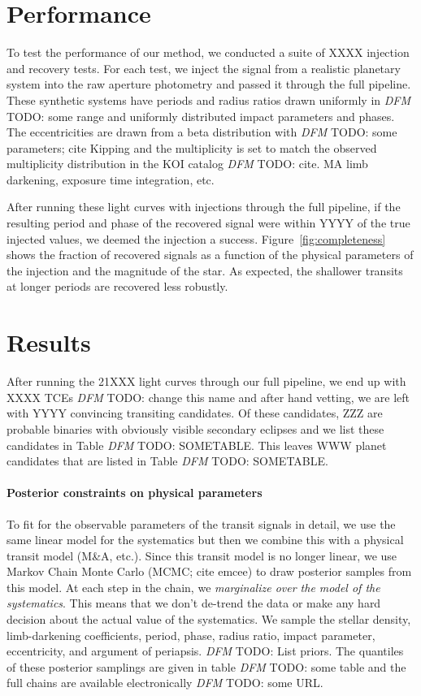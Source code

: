 \documentclass[12pt,preprint]{aastex}
\newcommand{\figref}[1]{\ref{fig:#1}}
\newcommand{\Fig}[1]{Figure~\figref{#1}}
\newcommand{\todo}[3]{{\color{#2} \emph{#1} TODO: #3}}
\newcommand{\dfmtodo}[1]{\todo{DFM}{red}{#1}}
\begin{document}
\section{Performance}

To test the performance of our method, we conducted a suite of XXXX injection
and recovery tests.
For each test, we inject the signal from a realistic planetary system into the
raw aperture photometry and passed it through the full pipeline.
These synthetic systems have periods and radius ratios drawn uniformly in
\dfmtodo{some range} and uniformly distributed impact parameters and phases.
The eccentricities are drawn from a beta distribution with \dfmtodo{some
parameters; cite Kipping} and the multiplicity is set to match the observed
multiplicity distribution in the KOI catalog \dfmtodo{cite}.
MA limb darkening, exposure time integration, etc.

After running these light curves with injections through the full pipeline, if
the resulting period and phase of the recovered signal were within YYYY of the
true injected values, we deemed the injection a success.
\Fig{completeness} shows the fraction of recovered signals as a function of the
physical parameters of the injection and the magnitude of the star.
As expected, the shallower transits at longer periods are recovered less
robustly.



\section{Results}

After running the 21XXX light curves through our full pipeline, we end up
with XXXX TCEs \dfmtodo{change this name} and after hand vetting, we are left
with YYYY convincing transiting candidates.
Of these candidates, ZZZ are probable binaries with obviously visible
secondary eclipses and we list these candidates in Table \dfmtodo{SOMETABLE}.
This leaves WWW planet candidates that are listed in Table
\dfmtodo{SOMETABLE}.

\paragraph{Posterior constraints on physical parameters}

To fit for the observable parameters of the transit signals in detail, we use
the same linear model for the systematics but then we combine this with a
physical transit model (M\&A, etc.).
Since this transit model is no longer linear, we use Markov Chain Monte Carlo
(MCMC; cite emcee) to draw posterior samples from this model.
At each step in the chain, we \emph{marginalize over the model of the
systematics}.
This means that we don't de-trend the data or make any hard decision about
the actual value of the systematics.
We sample the stellar density, limb-darkening coefficients, period, phase,
radius ratio, impact parameter, eccentricity, and argument of periapsis.
\dfmtodo{List priors.}
The quantiles of these posterior samplings are given in table \dfmtodo{some
table} and the full chains are available electronically \dfmtodo{some URL}.
\end{document}
